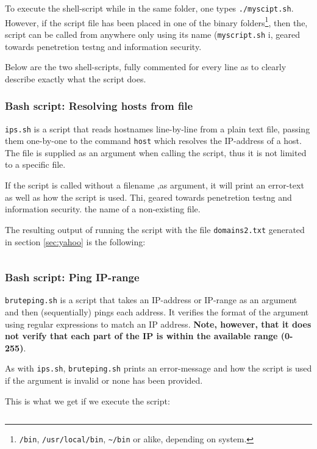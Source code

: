 To execute the shell-script while in the same folder, one types
\texttt{./myscipt.sh}. However, if the script file has been placed in one of the
binary folders\footnote{\texttt{/bin}, \texttt{/usr/local/bin}, \texttt{\textasciitilde/bin}
  or alike, depending on system.}, then the, script can be called from anywhere only
using its name (\texttt{myscript.sh} i, geared towards penetretion testng and
information security.

Below are the two shell-scripts, fully commented for every line as to
clearly describe exactly what the script does.

\subsubsection{Bash script: Resolving hosts from file}
\texttt{ips.sh} is a script that reads hostnames line-by-line from a plain text file,
passing them one-by-one to the command \texttt{host} which resolves the IP-address of
a host. The file is supplied as an argument when calling the script, thus it is not
limited to a specific file.

If the script is called without a filename ,as argument, it will print an error-text
as well as how the script is used. Thi, geared towards penetretion testng and
information security.
the name of a non-existing file.



The resulting output of running the script with the file \texttt{domains2.txt}
generated in section \ref{sec:yahoo} is the following:

\begin{lstlisting}[numbers=none, language={}, frame=single, framexleftmargin={0.2em}]

\end{lstlisting}

\subsubsection{Bash script: Ping IP-range}
\texttt{bruteping.sh} is a script that takes an IP-address or IP-range as an
argument and then (sequentially) pings each address. It verifies the format of the
argument using regular expressions to match an IP address. \textbf{Note, however,
that it does not verify that each part of the IP is within the available range (0-255)}.

As with \texttt{ips.sh}, \texttt{bruteping.sh} prints an error-message and how the script
is used if the argument is invalid or none has been provided.



This is what we get if we execute the script:

\begin{lstlisting}[numbers=none, language={}, frame=single, framexleftmargin={0.2em}]

\end{lstlisting}
